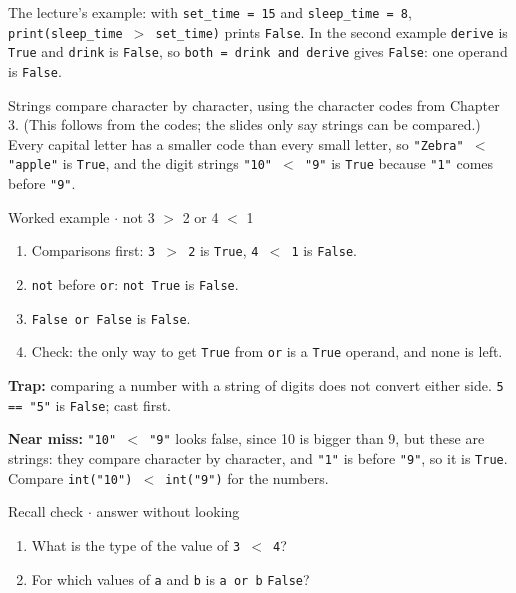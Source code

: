 \documentclass[11pt]{article}
\begin{document}
\begin{keepsection}
The lecture’s example: with \texttt{set\_time = 15} and \texttt{sleep\_time = 8}, \texttt{print(sleep\_time \ensuremath{>} set\_time)} prints \texttt{False}. In the second example \texttt{derive} is \texttt{True} and \texttt{drink} is \texttt{False}, so \texttt{both = drink and derive} gives \texttt{False}: one operand is \texttt{False}.

Strings compare character by character, using the character codes from Chapter 3. (This follows from the codes; the slides only say strings can be compared.) Every capital letter has a smaller code than every small letter, so \texttt{"Zebra" \ensuremath{<} "apple"} is \texttt{True}, and the digit strings \texttt{"10" \ensuremath{<} "9"} is \texttt{True} because \texttt{"1"} comes before \texttt{"9"}.

\begin{workedbox}{Worked example \ensuremath{\cdot} not 3 \ensuremath{>} 2 or 4 \ensuremath{<} 1}
\begin{enumerate}
\item Comparisons first: \texttt{3 \ensuremath{>} 2} is \texttt{True}, \texttt{4 \ensuremath{<} 1} is \texttt{False}.
\item \texttt{not} before \texttt{or}: \texttt{not True} is \texttt{False}.
\item \texttt{False or False} is \texttt{False}.
\item Check: the only way to get \texttt{True} from \texttt{or} is a \texttt{True} operand, and none is left.
\end{enumerate}
\end{workedbox}

\begin{notebox}\textbf{Trap:} comparing a number with a string of digits does not convert either side. \texttt{5 == "5"} is \texttt{False}; cast first.\end{notebox}

\begin{notebox}\textbf{Near miss:} \texttt{"10" \ensuremath{<} "9"} looks false, since 10 is bigger than 9, but these are strings: they compare character by character, and \texttt{"1"} is before \texttt{"9"}, so it is \texttt{True}. Compare \texttt{int("10") \ensuremath{<} int("9")} for the numbers.\end{notebox}

\begin{recallbox}{Recall check \ensuremath{\cdot} answer without looking}
\begin{enumerate}
\item What is the type of the value of \texttt{3 \ensuremath{<} 4}?
\item For which values of \texttt{a} and \texttt{b} is \texttt{a or b} \texttt{False}?
\end{enumerate}

\end{recallbox}
\end{keepsection}
\end{document}
